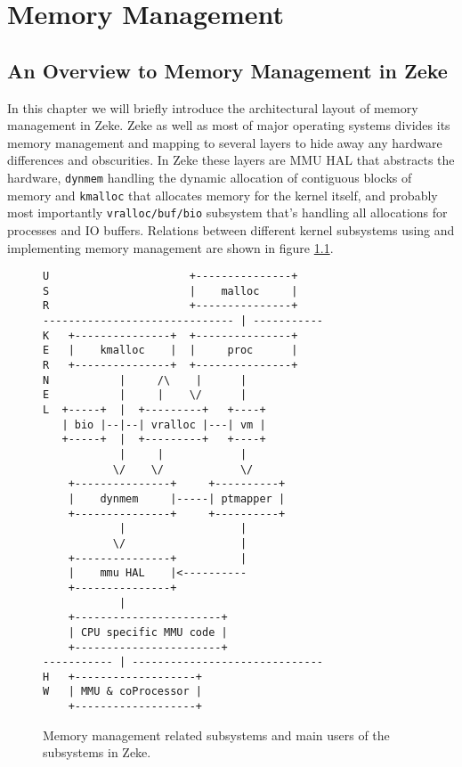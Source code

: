 \part{Memory Management}

\chapter{An Overview to Memory Management in Zeke}

In this chapter we will briefly introduce the architectural layout of memory
management in Zeke. Zeke as well as most of major operating systems divides
its memory management and mapping to several layers to hide away any hardware
differences and obscurities. In Zeke these layers are \ac{MMU} \acs{HAL} that
abstracts the hardware, \verb+dynmem+ handling the dynamic allocation of
contiguous blocks of memory and \verb+kmalloc+ that allocates memory for the
kernel itself, and probably most importantly \verb+vralloc/buf/bio+ subsystem
that's handling all allocations for processes and IO buffers. Relations between
different kernel subsystems using and implementing memory management are shown
in figure \ref{figure:vmsubsys}.

\begin{figure}
\begin{verbatim}
U                      +---------------+
S                      |    malloc     |
R                      +---------------+
------------------------------ | -----------
K   +---------------+  +---------------+
E   |    kmalloc    |  |     proc      |
R   +---------------+  +---------------+
N           |     /\    |      |
E           |     |    \/      |
L  +-----+  |  +---------+   +----+
   | bio |--|--| vralloc |---| vm |
   +-----+  |  +---------+   +----+
            |     |            |
           \/    \/            \/
    +---------------+     +----------+
    |    dynmem     |-----| ptmapper |
    +---------------+     +----------+
            |                  |
           \/                  |
    +---------------+          |
    |    mmu HAL    |<----------
    +---------------+
            |
    +-----------------------+
    | CPU specific MMU code |
    +-----------------------+
----------- | ------------------------------
H   +-------------------+
W   | MMU & coProcessor |
    +-------------------+
\end{verbatim}
\caption{Memory management related subsystems and main users of the subsystems
         in Zeke.}
\label{figure:vmsubsys}
\end{figure}

